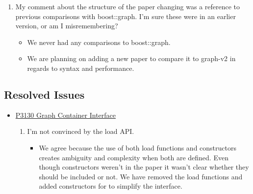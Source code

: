 \begin{itemize}
            \begin{enumerate}
                  \item My comment about the structure of the paper changing was a reference to previous comparisons with boost::graph. 
                        I'm sure these were in an earlier version, or am I misremembering?
                  \begin{itemize}
                        \item We never had any comparisons to boost::graph. 
                        \item We are planning on adding a new paper to compare it to graph-v2 in regards to syntax and performance.
                  \end{itemize}
            \end{enumerate}
\end{itemize}

\subsection{Resolved Issues}
\begin{itemize}
      \item \href{https://www.wg21.link/P3130}{P3130 Graph Container Interface}
            \begin{enumerate}
                  \item I'm not convinced by the load API.
                        \begin{itemize}
                              \item We agree because the use of both load functions and constructors creates ambiguity and complexity when both are defined.
                                    Even though constructors weren't in the paper it wasn't clear whether they should be included or not.
                                    We have removed the load functions and added constructors for  to simplify the interface.
                        \end{itemize}
            \end{enumerate}
\end{itemize}
